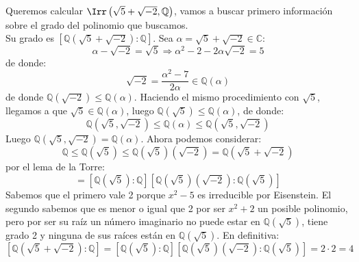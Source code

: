 \begin{ejemplo}
    Queremos calcular $\Irr\left(\sqrt{5}+\sqrt{-2}, \mathbb{Q}\right)$, vamos a buscar primero información sobre el grado del polinomio que buscamos.\\

    \noindent
    Su grado es $\left[\mathbb{Q}(\sqrt{5}+\sqrt{-2}):\mathbb{Q}\right]$. Sea $\alpha = \sqrt{5}+\sqrt{-2}\in \mathbb{C}$: 
    \begin{equation*}
        \alpha-\sqrt{-2} = \sqrt{5} \Longrightarrow \alpha^2 -2 -2\alpha\sqrt{-2} = 5
    \end{equation*}
    de donde:
    \begin{equation*}
        \sqrt{-2} = \dfrac{\alpha^2-7}{2\alpha} \in  \mathbb{Q}(\alpha)
    \end{equation*}
    de donde $\mathbb{Q}(\sqrt{-2}) \leq \mathbb{Q}(\alpha)$. Haciendo el mismo procedimiento con $\sqrt{5}$, llegamos a que $\sqrt{5}\in \mathbb{Q}(\alpha)$, luego $\mathbb{Q}\left(\sqrt{5}\right)\leq \mathbb{Q}(\alpha)$, de donde:
    \begin{equation*}
        \mathbb{Q}\left(\sqrt{5},\sqrt{-2}\right) \leq \mathbb{Q}(\alpha) \leq \mathbb{Q}\left(\sqrt{5},\sqrt{-2}\right)
    \end{equation*}
    Luego $\mathbb{Q}\left(\sqrt{5},\sqrt{-2}\right) = \mathbb{Q}(\alpha)$. Ahora podemos considerar:
    \begin{equation*}
        \mathbb{Q} \leq \mathbb{Q}\left(\sqrt{5}\right) \leq \mathbb{Q}\left(\sqrt{5}\right)\left(\sqrt{-2}\right) = \mathbb{Q}\left(\sqrt{5}+\sqrt{-2}\right)
    \end{equation*}
    por el lema de la Torre:
    \begin{equation*}
        [\mathbb{Q}(\sqrt{5}+\sqrt{-2}):\mathbb{Q}] = \left[\mathbb{Q}\left(\sqrt{5}\right):\mathbb{Q}\right] \left[\mathbb{Q}\left(\sqrt{5}\right)\left(\sqrt{-2}\right):\mathbb{Q}\left(\sqrt{5}\right)\right]
    \end{equation*}
    Sabemos que el primero vale 2 porque $x^2-5$ es irreducible por Eisenstein. El segundo sabemos que es menor o igual que 2 por ser $x^2+2$ un posible polinomio, pero por ser su raíz un número imaginario no puede estar en $\mathbb{Q}(\sqrt{5})$, tiene grado 2 y ninguna de sus raíces están en $\mathbb{Q}(\sqrt{5})$. En definitiva:
    \begin{equation*}
        \left[\mathbb{Q}(\sqrt{5}+\sqrt{-2}):\mathbb{Q}\right] = \left[\mathbb{Q}\left(\sqrt{5}\right):\mathbb{Q}\right] \left[\mathbb{Q}\left(\sqrt{5}\right)\left(\sqrt{-2}\right):\mathbb{Q}\left(\sqrt{5}\right)\right] = 2\cdot 2 =  4

\end{equation*}
\end{ejemplo}
